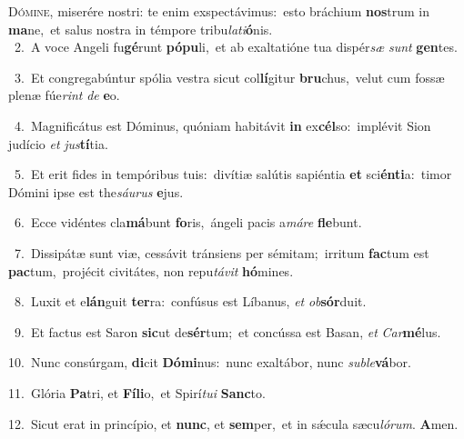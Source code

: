 \lettrine{\initial\textcolor{\initialcolor}{D}}{ómine,} miserére nostri: te enim exspectávimus:~\dagger esto bráchium \textbf{nos}\-trum in \textbf{ma}\-ne,~\star et salus nostra in témpore tribu\-\textit{la}\-\textit{ti}\textbf{ó}nis.\\
{\numbfont\textcolor{\numbcolor}{~2.}}~A voce Angeli fu\-\textbf{gé}\-runt \textbf{pó}\-\textbf{pu}li,~\star et ab exaltatióne tua dispér\textit{sæ} \textit{sunt} \textbf{gen}\-tes.\par
{\numbfont\textcolor{\numbcolor}{~3.}}~Et congregabúntur spólia vestra sicut col\-\textbf{lí}\-gitur \textbf{bru}\-chus,~\star velut cum fossæ plenæ fúe\textit{rint} \textit{de} \textbf{e}\-o.\par
{\numbfont\textcolor{\numbcolor}{~4.}}~Magnificátus est Dóminus, quóniam habitávit \textbf{in} ex\-\textbf{cél}\-so:~\star implévit Sion judício \textit{et} \textit{jus}\-\textbf{tí}tia.\par
{\numbfont\textcolor{\numbcolor}{~5.}}~Et erit fides in tempóribus tuis:~\dagger divítiæ salútis sapiéntia \textbf{et} sci\-\textbf{én}\-\textbf{ti}a:~\star timor Dómini ipse est the\-\textit{sáu}\-\textit{rus} \textbf{e}\-jus.\par
{\numbfont\textcolor{\numbcolor}{~6.}}~Ecce vidéntes cla\-\textbf{má}\-bunt \textbf{fo}\-ris,~\star ángeli pacis a\-\textit{má}\-\textit{re} \textbf{fle}\-bunt.\par
{\numbfont\textcolor{\numbcolor}{~7.}}~Dissipátæ sunt viæ, cessávit tránsiens per sémitam;~\dagger irritum \textbf{fac}\-tum est \textbf{pac}\-tum,~\star projécit civitátes, non repu\-\textit{tá}\-\textit{vit} \textbf{hó}\-mines.\par
{\numbfont\textcolor{\numbcolor}{~8.}}~Luxit et e\-\textbf{lán}\-guit \textbf{ter}\-ra:~\star confúsus est Líbanus, \textit{et} \textit{ob}\-\textbf{sór}duit.\par
{\numbfont\textcolor{\numbcolor}{~9.}}~Et factus est Saron \textbf{sic}\-ut de\-\textbf{sér}\-tum;~\star et concússa est Basan, \textit{et} \textit{Car}\-\textbf{mé}lus.\par
{\numbfont\textcolor{\numbcolor}{10.}}~Nunc consúrgam, \textbf{di}\-cit \textbf{Dó}\-\textbf{mi}nus:~\star nunc exaltábor, nunc \textit{sub}\-\textit{le}\textbf{vá}bor.\par
{\numbfont\textcolor{\numbcolor}{11.}}~Glória \textbf{Pa}\-tri, et \textbf{Fí}\-\textbf{li}o,~\star et Spirí\-\textit{tu}\-\textit{i} \textbf{Sanc}\-to.\par
{\numbfont\textcolor{\numbcolor}{12.}}~Sicut erat in princípio, et \textbf{nunc}\-, et \textbf{sem}\-per,~\star et in sǽcula sæcu\-\textit{ló}\-\textit{rum}. \textbf{A}\-men.\par
